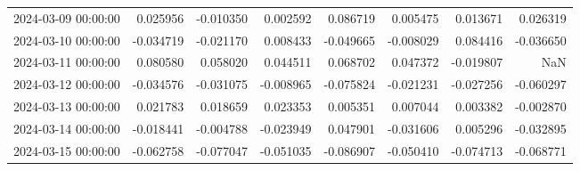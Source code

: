 \begin{tabular}{lrrrrrrr}
2024-03-09 00:00:00 & 0.025956 & -0.010350 & 0.002592 & 0.086719 & 0.005475 & 0.013671 & 0.026319 \\
2024-03-10 00:00:00 & -0.034719 & -0.021170 & 0.008433 & -0.049665 & -0.008029 & 0.084416 & -0.036650 \\
2024-03-11 00:00:00 & 0.080580 & 0.058020 & 0.044511 & 0.068702 & 0.047372 & -0.019807 & NaN \\
2024-03-12 00:00:00 & -0.034576 & -0.031075 & -0.008965 & -0.075824 & -0.021231 & -0.027256 & -0.060297 \\
2024-03-13 00:00:00 & 0.021783 & 0.018659 & 0.023353 & 0.005351 & 0.007044 & 0.003382 & -0.002870 \\
2024-03-14 00:00:00 & -0.018441 & -0.004788 & -0.023949 & 0.047901 & -0.031606 & 0.005296 & -0.032895 \\
2024-03-15 00:00:00 & -0.062758 & -0.077047 & -0.051035 & -0.086907 & -0.050410 & -0.074713 & -0.068771 \\
\bottomrule
\end{tabular}
